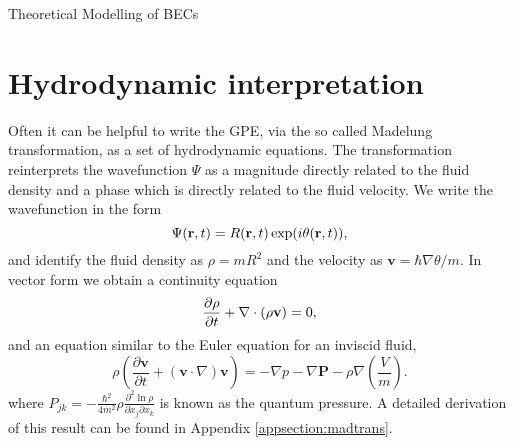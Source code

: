 \begin{chapter}{\label{cha:theoretical_model}Theoretical Modelling of BECs}
\section{\label{section:hydrodynamic} Hydrodynamic interpretation}
	Often it can be helpful to write the GPE, via the so called Madelung transformation, as a set of hydrodynamic equations. The transformation reinterprets the wavefunction $\Psi$ as a magnitude directly related to the fluid density and a phase which is directly related to the fluid velocity. We write the wavefunction in the form
	\begin{equation}
		\Psi({\bf r},t) = R({\bf r},t)\exp (i\theta({\bf r},t)),
	\end{equation}
	 and identify the fluid density as $\rho=mR^2$ and the velocity as $\mathbf{v} = \hbar\nabla\theta/m $.
	In vector form we obtain a continuity equation
	\begin{equation}
	  \frac{\partial \rho}{\partial t} + \nabla\cdot(\rho{\bf v}) = 0,
	  \label{eq:MTcont}
	\end{equation}
	and an equation similar to the Euler equation for an inviscid fluid,
	\begin{equation}
	\rho\left( \frac{\partial \mathbf{v}}{\partial t} + \left( \mathbf{v} \cdot \nabla \right)\mathbf{v} \right) = -\nabla p - \nabla \mathbf{P} - \rho \nabla \left(\frac{V}{m}\right).
	\end{equation}
	where $P_{jk} = -\frac{\hbar^2}{4m^2}\rho\frac{\partial^2\ln{\rho}}{\partial x_j \partial x_k}$ is known as the quantum pressure.
	A detailed derivation of this result can be found in Appendix \ref{appsection:madtrans}.


\end{chapter}

